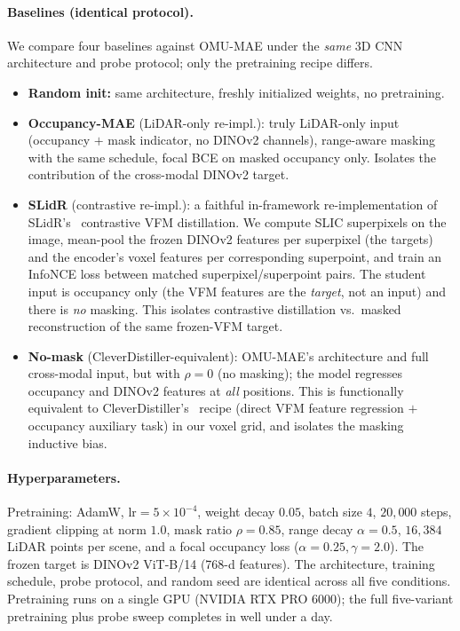 \paragraph{Baselines (identical protocol).}
We compare four baselines against OMU-MAE under the \emph{same} 3D CNN
architecture and probe protocol; only the pretraining recipe differs.
\begin{itemize}
\item \textbf{Random init:} same architecture, freshly initialized
weights, no pretraining.
\item \textbf{Occupancy-MAE} (LiDAR-only re-impl.): truly LiDAR-only input
(occupancy $+$ mask indicator, no DINOv2 channels), range-aware masking
with the same schedule, focal BCE on masked occupancy only. Isolates the
contribution of the cross-modal DINOv2 target.
\item \textbf{SLidR} (contrastive re-impl.): a faithful in-framework
re-implementation of SLidR's~\cite{slidr} contrastive VFM distillation. We
compute SLIC superpixels on the image, mean-pool the frozen DINOv2
features per superpixel (the targets) and the encoder's voxel features per
corresponding superpoint, and train an InfoNCE loss between matched
superpixel/superpoint pairs. The student input is occupancy only (the VFM
features are the \emph{target}, not an input) and there is \emph{no}
masking. This isolates contrastive distillation vs.\ masked
reconstruction of the same frozen-VFM target.
\item \textbf{No-mask} (CleverDistiller-equivalent): OMU-MAE's
architecture and full cross-modal input, but with $\rho=0$ (no masking);
the model regresses occupancy and DINOv2 features at \emph{all} positions.
This is functionally equivalent to CleverDistiller's~\cite{cleverdistiller}
recipe (direct VFM feature regression $+$ occupancy auxiliary task) in our
voxel grid, and isolates the masking inductive bias.
\end{itemize}

\paragraph{Hyperparameters.}
Pretraining: AdamW, $\text{lr}=5\times10^{-4}$, weight decay $0.05$, batch
size $4$, $20{,}000$ steps, gradient clipping at norm $1.0$, mask ratio
$\rho=0.85$, range decay $\alpha=0.5$, $16{,}384$ LiDAR points per scene,
and a focal occupancy loss ($\alpha=0.25,\gamma=2.0$). The frozen target
is DINOv2 ViT-B/14 (768-d features). The architecture, training schedule,
probe protocol, and random seed are identical across all five conditions.
Pretraining runs on a single GPU (NVIDIA RTX PRO 6000); the full
five-variant pretraining plus probe sweep completes in well under a day.
